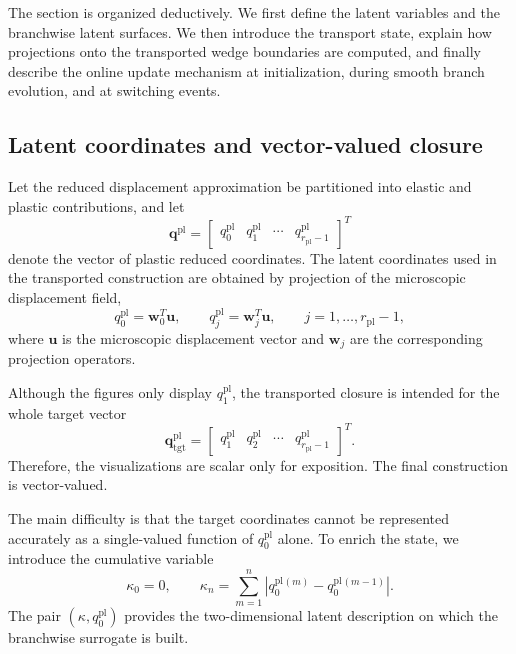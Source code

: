 \documentclass[11pt,a4paper]{article}
\begin{document}
The section is organized deductively. We first define the latent variables and the branchwise latent surfaces. We then introduce the transport state, explain how projections onto the transported wedge boundaries are computed, and finally describe the online update mechanism at initialization, during smooth branch evolution, and at switching events.

\subsection{Latent coordinates and vector-valued closure}

Let the reduced displacement approximation be partitioned into elastic and plastic contributions, and let
\begin{equation}
\mathbf{q}^{\mathrm{pl}}
=
\begin{bmatrix}
q^{\mathrm{pl}}_0 &
q^{\mathrm{pl}}_1 &
\cdots &
q^{\mathrm{pl}}_{r_{\mathrm{pl}}-1}
\end{bmatrix}^{T}
\end{equation}
denote the vector of plastic reduced coordinates. The latent coordinates used in the transported construction are obtained by projection of the microscopic displacement field,
\begin{equation}
q^{\mathrm{pl}}_0 = \mathbf{w}_0^{T}\mathbf{u},
\qquad
q^{\mathrm{pl}}_j = \mathbf{w}_j^{T}\mathbf{u},
\qquad
j=1,\dots,r_{\mathrm{pl}}-1,
\label{eq:qpl_projection_transport_ts_ref}
\end{equation}
where \(\mathbf{u}\) is the microscopic displacement vector and \(\mathbf{w}_j\) are the corresponding projection operators.

Although the figures only display \(q^{\mathrm{pl}}_1\), the transported closure is intended for the whole target vector
\begin{equation}
\mathbf{q}^{\mathrm{pl}}_{\mathrm{tgt}}
=
\begin{bmatrix}
q^{\mathrm{pl}}_1 &
q^{\mathrm{pl}}_2 &
\cdots &
q^{\mathrm{pl}}_{r_{\mathrm{pl}}-1}
\end{bmatrix}^{T}.
\label{eq:qpl_target_vector_transport_ts_ref}
\end{equation}
Therefore, the visualizations are scalar only for exposition. The final construction is vector-valued.

The main difficulty is that the target coordinates cannot be represented accurately as a single-valued function of \(q^{\mathrm{pl}}_0\) alone. To enrich the state, we introduce the cumulative variable
\begin{equation}
\kappa_0 = 0,
\qquad
\kappa_n
=
\sum_{m=1}^{n}
\left|
q^{\mathrm{pl}}_0{}^{(m)}
-
q^{\mathrm{pl}}_0{}^{(m-1)}
\right|.
\label{eq:kappa_definition_transport_ts_ref}
\end{equation}
The pair \((\kappa,q^{\mathrm{pl}}_0)\) provides the two-dimensional latent description on which the branchwise surrogate is built.
\end{document}
